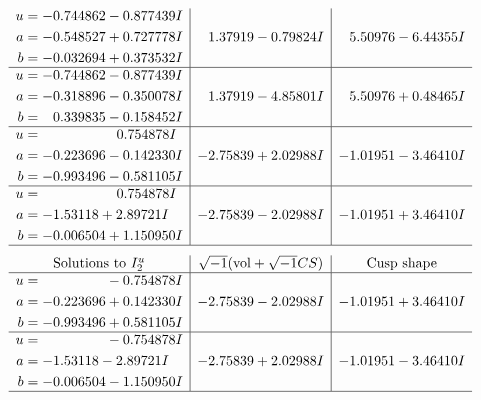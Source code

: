\documentclass[1p]{elsarticle_modified}
\theoremstyle{definition}
\newcommand{\I}{\sqrt{-1}}
\begin{document}
$$\begin{array}{c|c|c}
\begin{aligned}
u &= -0.744862 - 0.877439 I \\
a &= -0.548527 + 0.727778 I \\
b &= -0.032694 + 0.373532 I\end{aligned}
 & \phantom{-}1.37919 - 0.79824 I & \phantom{-}5.50976 - 6.44355 I \\ \hline\begin{aligned}
u &= -0.744862 - 0.877439 I \\
a &= -0.318896 - 0.350078 I \\
b &= \phantom{-}0.339835 - 0.158452 I\end{aligned}
 & \phantom{-}1.37919 - 4.85801 I & \phantom{-}5.50976 + 0.48465 I \\ \hline\begin{aligned}
u &= \phantom{-0.000000 -}0.754878 I \\
a &= -0.223696 - 0.142330 I \\
b &= -0.993496 - 0.581105 I\end{aligned}
 & -2.75839 + 2.02988 I & -1.01951 - 3.46410 I \\ \hline\begin{aligned}
u &= \phantom{-0.000000 -}0.754878 I \\
a &= -1.53118 + 2.89721 I \\
b &= -0.006504 + 1.150950 I\end{aligned}
 & -2.75839 - 2.02988 I & -1.01951 + 3.46410 I\\
 \hline 
 \end{array}$$\newpage$$\begin{array}{c|c|c}  
\text{Solutions to }I^u_{2}& \I (\text{vol} + \sqrt{-1}CS) & \text{Cusp shape}\\
 \hline 
\begin{aligned}
u &= \phantom{-0.000000 } -0.754878 I \\
a &= -0.223696 + 0.142330 I \\
b &= -0.993496 + 0.581105 I\end{aligned}
 & -2.75839 - 2.02988 I & -1.01951 + 3.46410 I \\ \hline\begin{aligned}
u &= \phantom{-0.000000 } -0.754878 I \\
a &= -1.53118 - 2.89721 I \\
b &= -0.006504 - 1.150950 I\end{aligned}
 & -2.75839 + 2.02988 I & -1.01951 - 3.46410 I\\
 \hline 
 \end{array}$$\newpage
\end{document}

